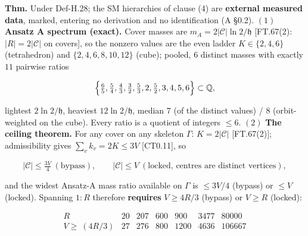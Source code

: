 \begin{theorem}\label{tag:FT-79}
\textbf{Thm.} Under Def-H.28; the SM hierarchies of clause (4) are \textbf{external measured data}, marked, entering no derivation and no identification (A §0.2). $(1)$ \textbf{Ansatz A spectrum (exact).} Cover masses are $m_A=2|\mathcal C|\ln2/\mathfrak h$ [FT.67(2): $|R|=2|\mathcal C|$ on covers], so the nonzero values are the even ladder $K\in\{2,4,6\}$ (tetrahedron) and $\{2,4,6,8,10,12\}$ (cube); pooled, $6$ distinct masses with exactly $11$ pairwise ratios

\[
\Bigl\{\tfrac65,\tfrac54,\tfrac43,\tfrac32,\tfrac53,2,\tfrac52,3,4,5,6\Bigr\}\subset\mathbb Q,
\]

lightest $2\ln2/\mathfrak h$, heaviest $12\ln2/\mathfrak h$, median $7$ (of the distinct values) / $8$ (orbit-weighted on the cube). Every ratio is a quotient of integers $\le6$. $(2)$ \textbf{The ceiling theorem.} For any cover on any skeleton $\Gamma$: $K=2|\mathcal C|$ [FT.67(2)]; admissibility gives $\sum_vk_v=2K\le3V$ [CT0.11], so

\[
|\mathcal C|\le\tfrac{3V}{4}\ (\text{bypass}),\qquad |\mathcal C|\le V\ (\text{locked, centres are distinct vertices}),
\]

and the widest Ansatz-A mass ratio available on $\Gamma$ is $\le3V/4$ (bypass) or $\le V$ (locked). Spanning $1{:}R$ therefore \textbf{requires} $V\ge4R/3$ (bypass) or $V\ge R$ (locked):

\[
\begin{array}{c|cccccc}
R & 20 & 207 & 600 & 900 & 3477 & 80000\\
\hline
V\ge\ (4R/3) & 27 & 276 & 800 & 1200 & 4636 & 106667
\end{array}
\]


\end{theorem}
